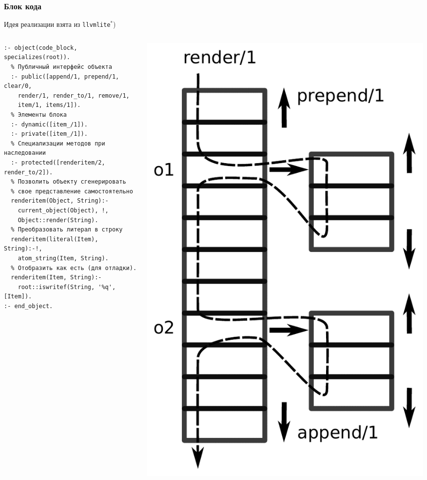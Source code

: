 \documentclass[10pt]{beamer}
\begin{document}
\begin{frame}[fragile]
\frametitle{Блок кода}
 Идея реализации взята из \texttt{llvmlite}${}^*$)
  \begin{columns}
    \begin{column}{0.6\textwidth}
      \flushleft
\begin{verbatim}
:- object(code_block, specializes(root)).
  % Публичный интерфейс объекта
  :- public([append/1, prepend/1, clear/0,
    render/1, render_to/1, remove/1,
    item/1, items/1]).
  % Элементы блока
  :- dynamic([item_/1]).
  :- private([item_/1]).
  % Специализации методов при наследовании
  :- protected([renderitem/2, render_to/2]).
  % Позволить объекту сгенерировать
  % свое представление самостоятельно
  renderitem(Object, String):-
    current_object(Object), !,
    Object::render(String).
  % Преобразовать литерал в строку
  renderitem(literal(Item), String):-!,
    atom_string(Item, String).
  % Отобразить как есть (для отладки).
  renderitem(Item, String):-
    root::iswritef(String, '%q', [Item]).
:- end_object.
\end{verbatim}
    \end{column}
    \begin{column}{0.4\textwidth}
      \includegraphics[width=1\linewidth]{code_block.pdf}

\end{column}
\end{columns}
\end{frame}
\end{document}
